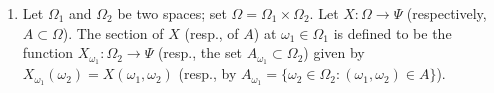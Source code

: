 \documentclass[letterpaper, 12pt]{article}
\newcommand{\cC}{\mathcal{C}}
\newcommand{\cR}{\mathcal{R}}
\newcommand{\cU}{\mathcal{U}}
\begin{document}
\begin{enumerate}
%
\item
Let $\Omega_1$ and $\Omega_2$ be two spaces; set $\Omega = \Omega_1\times\Omega_2$. 
Let $X:\Omega\to\Psi$ (respectively, $A\subset\Omega$). 
The section of $X$ (resp., of $A$) at $\omega_1\in\Omega_1$ is defined to be the function $X_{\omega_1}:\Omega_2\to\Psi$ 
(resp., the set $A_{\omega_1}\subset\Omega_2$) 
given by $X_{\omega_1}(\omega_2)=X(\omega_1,\omega_2)$ 
(resp., by $A_{\omega_1}=\{ \omega_2\in\Omega_2: (\omega_1,\omega_2)\in A \}$).


\end{enumerate}
\end{document}
